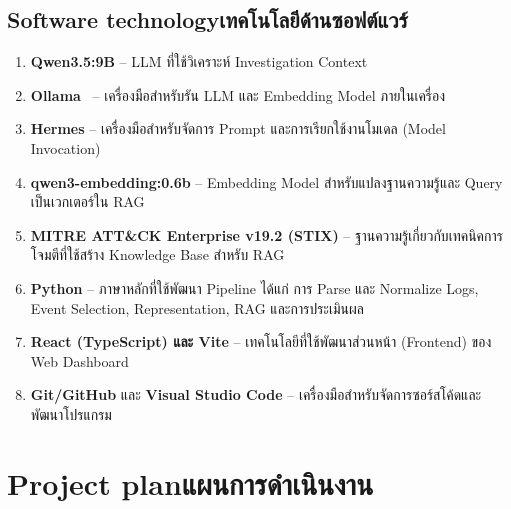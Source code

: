 \subsection{\ifenglish Software technology\else เทคโนโลยีด้านซอฟต์แวร์\fi}
\begin{enumerate}


    \item \textbf{Qwen3.5:9B} -- LLM ที่ใช้วิเคราะห์ Investigation Context

    \item \textbf{Ollama}~\cite{ollama} -- เครื่องมือสำหรับรัน
          LLM และ Embedding Model ภายในเครื่อง

    \item \textbf{Hermes} -- เครื่องมือสำหรับจัดการ Prompt
          และการเรียกใช้งานโมเดล (Model Invocation)

    \item \textbf{qwen3-embedding:0.6b} -- Embedding Model สำหรับแปลงฐานความรู้และ Query เป็นเวกเตอร์ใน RAG

    \item \textbf{MITRE ATT\&CK Enterprise v19.2 (STIX)}
          -- ฐานความรู้เกี่ยวกับเทคนิคการโจมตีที่ใช้สร้าง
          Knowledge Base สำหรับ RAG

    \item \textbf{Python} -- ภาษาหลักที่ใช้พัฒนา Pipeline
          ได้แก่ การ Parse และ Normalize Logs, Event Selection,
          Representation, RAG และการประเมินผล

    \item \textbf{React (TypeScript) และ Vite} -- เทคโนโลยีที่ใช้พัฒนาส่วนหน้า (Frontend) ของ Web Dashboard

    \item \textbf{Git/GitHub} และ \textbf{Visual Studio Code}
          -- เครื่องมือสำหรับจัดการซอร์สโค้ดและพัฒนาโปรแกรม
\end{enumerate}

\section{\ifenglish Project plan\else แผนการดำเนินงาน\fi}

